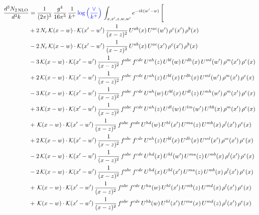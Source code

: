 \documentclass[10pt]{article}
\numberwithin{equation}{section}
\begin{document}
\begin{align}
\frac{d^{3}N_{2\,\mathrm{NLO}}}{d^{3}k} & = \frac{1}{(2\pi)^{3}}\,\frac{g^{4}}{16\pi^{5}}\,\frac{1}{k^{+}}\,{\color{blue}\log{\left(\frac{\vee}{k^{+}}\right)}}\,\int_{x,x',z,w,w'}e^{-ik(w'-w)}\,\Bigg[
\notag\\ &+2\,N_{c}\,\mathcal{K}(x-w)\cdot\mathcal{K}(x'-w')\,\frac{1}{(x-z)^{2}}\,U^{ab}(x)\,U^{ac}(w')\,\rho^{c}(x')\,\rho^{b}(x)\notag\\
&-2\,N_{c}\,\mathcal{K}(x-w)\cdot\mathcal{K}(x'-w')\,\frac{1}{(x-z)^{2}}\,U^{ab}(x)\,U^{ac}(x')\,\rho^{c}(x')\,\rho^{b}(x)\notag\\
&-3\,\mathcal{K}(x-w)\cdot\mathcal{K}(x'-w')\,\frac{1}{(x-z)^{2}}\,f^{abc}\,f^{cde}\,U^{ah}(z)\,U^{bl}(w)\,U^{dh}(x)\,U^{ml}(w')\,\rho^{m}(x')\,\rho^{e}(x)\notag\\
&+2\,\mathcal{K}(x-w)\cdot\mathcal{K}(x'-w')\,\frac{1}{(x-z)^{2}}\,f^{abc}\,f^{cde}\,U^{ah}(z)\,U^{bl}(x)\,U^{dh}(x)\,U^{ml}(w')\,\rho^{m}(x')\,\rho^{e}(x)\notag\\
&-3\,\mathcal{K}(x-w)\cdot\mathcal{K}(x'-w')\,\frac{1}{(x-z)^{2}}\,f^{abc}\,f^{cde}\,U^{ah}(w)\,U^{bl}(x)\,U^{dl}(z)\,U^{mh}(w')\,\rho^{m}(x')\,\rho^{e}(x)\notag\\
&+3\,\mathcal{K}(x-w)\cdot\mathcal{K}(x'-w')\,\frac{1}{(x-z)^{2}}\,f^{abc}\,f^{cde}\,U^{ah}(z)\,U^{dl}(w)\,U^{lm}(w')\,U^{hb}(x)\,\rho^{m}(x')\,\rho^{e}(x)\notag\\
&+\,\mathcal{K}(x-w)\cdot\mathcal{K}(x'-w')\,\frac{1}{(x-z)^{2}}\,f^{abc}\,f^{cde}\,U^{hd}(w)\,U^{hl}(x')\,U^{ma}(z)\,U^{mb}(x)\,\rho^{l}(x')\,\rho^{e}(x)\notag\\
&+2\,\mathcal{K}(x-w)\cdot\mathcal{K}(x'-w')\,\frac{1}{(x-z)^{2}}\,f^{abc}\,f^{cde}\,U^{ah}(z)\,U^{bl}(x)\,U^{dh}(x)\,U^{ml}(x')\,\rho^{m}(x')\,\rho^{e}(x)\notag\\
&-2\,\mathcal{K}(x-w)\cdot\mathcal{K}(x'-w')\,\frac{1}{(x-z)^{2}}\,f^{abc}\,f^{cde}\,U^{hd}(x)\,U^{hl}(w')\,U^{ma}(z)\,U^{mb}(x)\,\rho^{l}(x')\,\rho^{e}(x)\notag\\
&-2\,\mathcal{K}(x-w)\cdot\mathcal{K}(x'-w')\,\frac{1}{(x-z)^{2}}\,f^{abc}\,f^{cde}\,U^{hd}(x)\,U^{hl}(x')\,U^{ma}(z)\,U^{mb}(x)\,\rho^{l}(x')\,\rho^{e}(x)\notag\\
&+\,\mathcal{K}(x-w)\cdot\mathcal{K}(x'-w')\,\frac{1}{(x-z)^{2}}\,f^{abc}\,f^{cde}\,U^{ha}(w)\,U^{hl}(x')\,U^{mb}(z)\,U^{md}(x)\,\rho^{l}(x')\,\rho^{e}(x)\notag\\
&+\,\mathcal{K}(x-w)\cdot\mathcal{K}(x'-w')\,\frac{1}{(x-z)^{2}}\,f^{abc}\,f^{cde}\,U^{hb}(w)\,U^{hl}(x')\,U^{ma}(x)\,U^{md}(z)\,\rho^{l}(x')\,\rho^{e}(x)\notag\\

\end{align}
\end{document}
